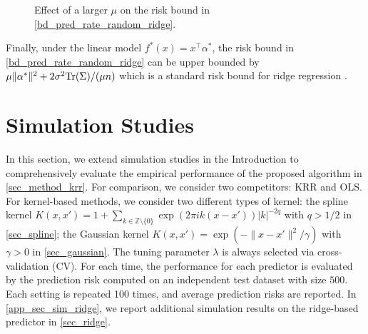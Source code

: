 \documentclass[11pt,twoside]{article}
\def\ZZ{\mathbb{Z}}
\def\tr{{\rm Tr}}
\begin{document}
\begin{figure}[ht]
\caption{Effect of a larger $\mu$ on the risk bound in \cref{bd_pred_rate_random_ridge}.}
\label{fig_change_mechanism}
\end{figure}



Finally, under the linear model $f^*(x) = x^\top \alpha^*$, the risk bound in \cref{bd_pred_rate_random_ridge} can be upper bounded by
$
              \mu \|\alpha^*\|^2  + {2\sigma^2 \tr(\Sigma) / (\mu n)}
$
which is a standard risk bound for ridge regression \citep[Remark 15]{hsu2014random}.













\section{Simulation Studies}\label{sec_sim}
In this section,  we extend simulation studies in the Introduction to comprehensively evaluate the empirical performance of the proposed algorithm in \cref{sec_method_krr}.  
For comparison, we consider two competitors: KRR and  OLS. 
 For kernel-based methods, we consider
 two different types of 
 kernel: the spline kernel
$K(x,x')= 1+\sum_{k\in \ZZ\setminus\{0\}}\exp(2\pi i k(x-x'))|k|^{-2q}$   with $q>1/2$ in \cref{sec_spline};   the Gaussian kernel $K(x,x') =\exp(-\|x-x'\| ^2/\gamma)$ with $\gamma>0$ in \cref{sec_gaussian}. 
The tuning parameter $\lambda$ is always selected via cross-validation (CV). For each time, the performance for each predictor is evaluated by the prediction risk computed on an independent test dataset with size $500$. 
Each setting is repeated  100 times, and average prediction risks are reported. In \cref{app_sec_sim_ridge}, we report additional simulation results on the ridge-based predictor in \cref{sec_ridge}.
\end{document}
